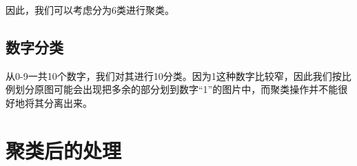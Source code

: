 因此，我们可以考虑分为6类进行聚类。

\subsection{数字分类}

从0-9一共10个数字，我们对其进行10分类。因为1这种数字比较窄，因此我们按比例划分原图可能会出现把多余的部分划到数字“1”的图片中，而聚类操作并不能很好地将其分离出来。

\section{聚类后的处理}
